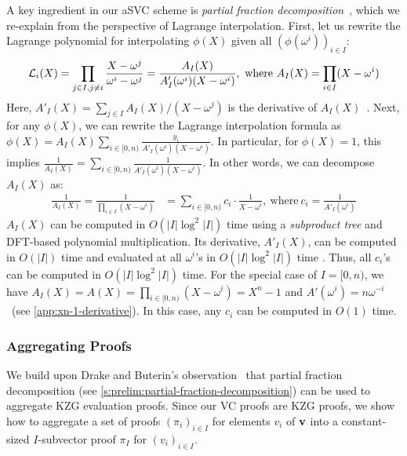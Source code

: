 A key ingredient in our aSVC scheme is \textit{partial fraction decomposition}\ifNotCameraReady~\cite{PartialFractionDecomposition}\fi, which we re-explain from the perspective of Lagrange interpolation.
First, let us rewrite the Lagrange polynomial for interpolating $\phi(X)$ given all $\left(\phi(\omega^i)\right)_{i\in I}$:
{\ifCameraReady\small\fi
\begin{align}
\lagr_i(X)=\prod_{j\in I, j\ne i} \frac{X-\omega^j}{\omega^i - \omega^j}=\frac{A_I(X)}{A'_I(\omega^i) (X-\omega^i)},\ \text{where}\ A_I(X)=\prod_{i\in I} (X-\omega^i)
\end{align}
}%
Here, $A'_I(X)=\sum_{j\in I} A_I(X)/(X-\omega^j)$ is the derivative of $A_I(X)$~\cite{vG13ModernCh10}.
Next, for any $\phi(X)$, we can rewrite the Lagrange interpolation formula as $\phi(X) = A_I(X)\sum_{i\in[0,n)} \frac{y_i}{A'_I(\omega^i)(X-\omega^i)}$.
In particular, for $\phi(X)=1$, this implies $\frac{1}{A_I(X)} = \sum_{i\in[0,n)} \frac{1}{A'_I(\omega^i)(X-\omega^i)}$.
In other words, we can decompose $A_I(X)$ as:
{\ifCameraReady\small\fi
\begin{align}
\frac{1}{A_I(X)} = \frac{1}{\prod_{i \in I} (X-\omega^i)} &= \sum_{i\in[0,n)} c_i\cdot \frac{1}{X-\omega^i},\ \text{where}\ c_i=\frac{1}{A'_I(\omega^i)}
\end{align}
}%
$A_I(X)$ can be computed in $O(|I|\log^2{|I|})$ time\ifNotCameraReady\xspace using a \textit{subproduct tree} and DFT-based polynomial multiplication\fi\xspace\cite{vG13ModernCh10}.
Its derivative, $A'_I(X)$, can be computed in $O(|I|)$ time and evaluated at all $\omega^i$'s in $O(|I|\log^2{|I|})$ time \cite{vG13ModernCh10}.
Thus, all $c_i$'s can be computed in $O(|I|\log^2{|I|})$ time.
For the special case of $I=[0,n)$, we have $A_I(X)=A(X)=\prod_{i\in[0,n)} (X-\omega^i)=X^n - 1$ and $A'(\omega^i)=n\omega^{-i}$ \ifCameraReady~\cite[Appendix A]{TAB+20e}\else\xspace(see \cref{app:xn-1-derivative})\fi.
In this case, any $c_i$ can be computed in $O(1)$ time.

\subsubsection{Aggregating Proofs}
\label{s:asvc:from-kzg:aggregating-proofs}
We build upon Drake and Buterin's observation~\cite{Buterin20UsingPoly} that partial fraction decomposition (see \cref{s:prelim:partial-fraction-decomposition}) can be used to aggregate KZG evaluation proofs.
Since our VC proofs are KZG proofs, we show how to aggregate a set of proofs $(\pi_i)_{i\in I}$ for elements $v_i$ of $\bm{\mathrm{v}}$ into a constant-sized $I$-subvector proof $\pi_I$ for $(v_i)_{i\in I}$.

